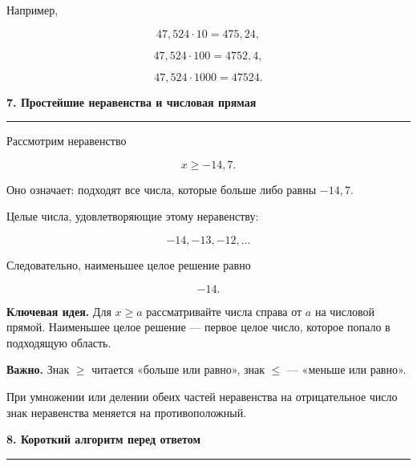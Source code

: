 \documentclass[a4paper,12pt]{article}
\newcommand{\sectiontitle}[1]{%
  \vspace{0.6em}%
  {\Large\bfseries\textcolor{darkaccent}{#1}}\par
  \vspace{0.25em}%
  {\color{linegray}\rule{\linewidth}{0.6pt}}\par
  \vspace{0.5em}%
}
\newcommand{\keyidea}[1]{%
  \textbf{\textcolor{darkaccent}{Ключевая идея.}} #1
}
\newcommand{\warning}[1]{%
  \textbf{\textcolor{accent}{Важно.}} #1
}
\begin{document}
Например,

\[
47{,}524\cdot10=475{,}24,
\]

\[
47{,}524\cdot100=4752{,}4,
\]

\[
47{,}524\cdot1000=47524.
\]


\sectiontitle{7. Простейшие неравенства и числовая прямая}

Рассмотрим неравенство

\[
x\ge -14{,}7.
\]

Оно означает: подходят все числа, которые больше либо равны $-14{,}7$.

\begin{center}
\end{center}

Целые числа, удовлетворяющие этому неравенству:

\[
-14,-13,-12,\ldots
\]

Следовательно, наименьшее целое решение равно

\[
\boxed{-14}.
\]

\keyidea{
Для $x\ge a$ рассматривайте числа справа от $a$ на числовой прямой.
Наименьшее целое решение --- первое целое число, которое попало
в подходящую область.
}

\warning{
Знак $\ge$ читается «больше или равно»,
знак $\le$ --- «меньше или равно».

При умножении или делении обеих частей неравенства
на отрицательное число знак неравенства меняется
на противоположный.
}


\sectiontitle{8. Короткий алгоритм перед ответом}
\end{document}
